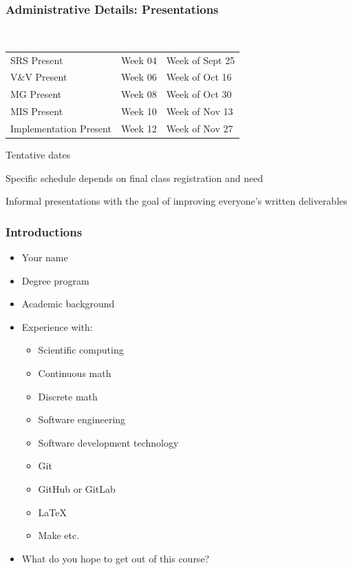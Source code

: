 \documentclass[t,12pt,numbers,fleqn]{beamer}
\begin{document}

\begin{frame}
\frametitle{Administrative Details: Presentations}

~\newline
\begin{tabular}{l l l}
SRS Present & Week 04 & Week of Sept 25\\
V\&V Present & Week 06 & Week of Oct 16\\
MG Present & Week 08 & Week of Oct 30\\
MIS Present & Week 10 & Week of Nov 13\\
Implementation Present & Week 12 & Week of Nov 27\\
\end {tabular}

\bi
\item Tentative dates
\item Specific schedule depends on final class registration and need
\item Informal presentations with the goal of improving everyone's written
  deliverables
\ei

\end{frame}


\begin{frame}
\frametitle{Introductions}

\begin{itemize}
\item Your name
\item Degree program
\item Academic background
\item Experience with:
\begin{itemize}
\item Scientific computing
\item Continuous math
\item Discrete math
\item Software engineering
\item Software development technology
\bi
\item Git
\item GitHub or GitLab
\item LaTeX
\item Make etc.
\ei
\end{itemize}
\item What do you hope to get out of this course?
\end{itemize}

\end{frame}
\end{document}
